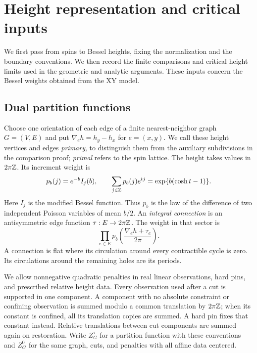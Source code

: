 \section{Height representation and critical inputs}\label{sec:heights}

We first pass from spins to Bessel heights, fixing the normalization
and the boundary conventions.  We then record the finite comparisons
and critical height limits used in the geometric and analytic arguments.
These inputs concern the Bessel weights obtained from the XY model.

\subsection{Dual partition functions}

Choose one orientation of each edge of a finite nearest-neighbor
graph \(G=(V,E)\) and put \(\nabla_eh=h_y-h_x\) for \(e=(x,y)\).
We call these height vertices and edges \emph{primary}, to distinguish
them from the auxiliary subdivisions in the comparison proof;
\emph{primal} refers to the spin lattice.
The height takes values in \(2\pi\mathbb Z\).  Its increment weight is
\begin{equation}\label{eq:bessel-weight}
 p_b(j)=e^{-b}I_j(b),\qquad
 \sum_{j\in\mathbb Z}p_b(j)e^{tj}=\exp\{b(\cosh t-1)\}.
\end{equation}
Here \(I_j\) is the modified Bessel function.  Thus \(p_b\) is the law
of the difference of two independent Poisson variables of mean \(b/2\).
An \emph{integral connection} is an antisymmetric edge function
\(\tau:E\to2\pi\mathbb Z\).  The weight in that sector is
\[
 \prod_{e\in E}p_b\left(\frac{\nabla_eh+\tau_e}{2\pi}\right).
\]
A connection is flat where its circulation around every contractible
cycle is zero.
Its circulations around the remaining holes are its periods.

We allow nonnegative quadratic penalties in real linear observations,
hard pins, and prescribed relative height data.  Every observation
used after a cut is supported in one component.  A component with no
absolute constraint or confining observation is summed modulo a common
translation by \(2\pi\mathbb Z\); when its constant is confined, all its
translation copies are summed.  A hard pin fixes that constant instead.
Relative translations between cut components are summed again on
restoration.  Write \(Z_G^\tau\) for a partition function with these
conventions and \(Z_G^0\) for the same graph, cuts, and penalties with
all affine data centered.

